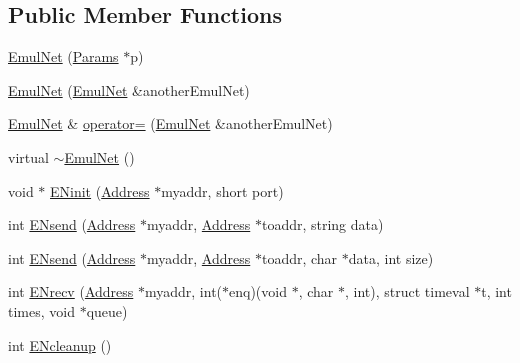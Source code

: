 \subsection*{\-Public \-Member \-Functions}
\begin{DoxyCompactItemize}
\item 
\hyperlink{class_emul_net_aa47ba47cbe2bf26bec96cfeaa0f6bbc9}{\-Emul\-Net} (\hyperlink{class_params}{\-Params} $\ast$p)
\item 
\hyperlink{class_emul_net_aec6f273238a0b975b79a9902f135f996}{\-Emul\-Net} (\hyperlink{class_emul_net}{\-Emul\-Net} \&another\-Emul\-Net)
\item 
\hyperlink{class_emul_net}{\-Emul\-Net} \& \hyperlink{class_emul_net_a62f34d25dc41fc3e07393a606905a0e2}{operator=} (\hyperlink{class_emul_net}{\-Emul\-Net} \&another\-Emul\-Net)
\item 
virtual \hyperlink{class_emul_net_aa8f1312e33ed1593753054651636798e}{$\sim$\-Emul\-Net} ()
\item 
void $\ast$ \hyperlink{class_emul_net_aea9b348d4fef905c7975ddabc65a64cb}{\-E\-Ninit} (\hyperlink{class_address}{\-Address} $\ast$myaddr, short port)
\item 
int \hyperlink{class_emul_net_aa02db2ae1e9d846f682b036284c479a5}{\-E\-Nsend} (\hyperlink{class_address}{\-Address} $\ast$myaddr, \hyperlink{class_address}{\-Address} $\ast$toaddr, string data)
\item 
int \hyperlink{class_emul_net_a25ce00454279129ac52cc21f7afb2c43}{\-E\-Nsend} (\hyperlink{class_address}{\-Address} $\ast$myaddr, \hyperlink{class_address}{\-Address} $\ast$toaddr, char $\ast$data, int size)
\item 
int \hyperlink{class_emul_net_a4584812b7ed2bb20cd7ab8b29bf2f05f}{\-E\-Nrecv} (\hyperlink{class_address}{\-Address} $\ast$myaddr, int($\ast$enq)(void $\ast$, char $\ast$, int), struct timeval $\ast$t, int times, void $\ast$queue)
\item 
int \hyperlink{class_emul_net_a5bf56d688164a30bb49cb444f1bbe2ea}{\-E\-Ncleanup} ()
\end{DoxyCompactItemize}
